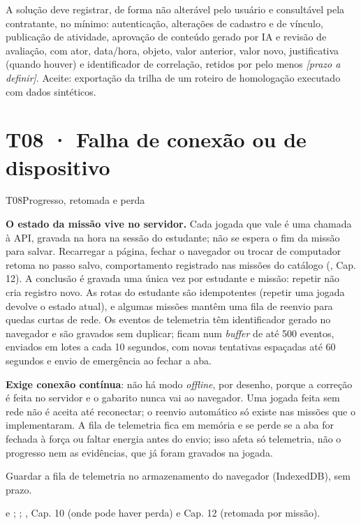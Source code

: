 \begin{paraotr}
A solução deve registrar, de forma não alterável pelo usuário e consultável
pela contratante, no mínimo: autenticação, alterações de cadastro e de
vínculo, publicação de atividade, aprovação de conteúdo gerado por IA e
revisão de avaliação, com ator, data/hora, objeto, valor anterior, valor novo,
justificativa (quando houver) e identificador de correlação, retidos por pelo
menos \textit{[prazo a definir]}. Aceite: exportação da trilha de um roteiro
de homologação executado com dados sintéticos.
\end{paraotr}

\section{T08 · Falha de conexão ou de dispositivo}
\label{sec:t08}

\begin{resposta}{T08}{Progresso, retomada e perda}{\parcial}
\begin{campos}
  \item[Hoje] \textbf{O estado da missão vive no servidor.} Cada jogada que
    vale é uma chamada à API, gravada na hora na sessão do estudante; não se
    espera o fim da missão para salvar. Recarregar a página, fechar o
    navegador ou trocar de computador retoma no passo salvo, comportamento
    registrado nas missões do catálogo (, Cap. 12). A conclusão
    é gravada uma única vez por estudante e missão: repetir não cria registro
    novo. As rotas do estudante são idempotentes (repetir uma jogada devolve o
    estado atual), e algumas missões mantêm uma fila de reenvio para quedas
    curtas de rede. Os eventos de telemetria têm identificador gerado no
    navegador e são gravados sem duplicar; ficam num \emph{buffer} de até 500
    eventos, enviados em lotes a cada 10 segundos, com novas tentativas
    espaçadas até 60 segundos e envio de emergência ao fechar a aba.
  \item[Limitações] \textbf{Exige conexão contínua}: não há modo
    \emph{offline}, por desenho, porque a correção é feita no servidor e o
    gabarito nunca vai ao navegador. Uma jogada feita sem rede não é aceita
    até reconectar; o reenvio automático só existe nas missões que o
    implementaram. A fila de telemetria fica em memória e se perde se a aba
    for fechada à força ou faltar energia antes do envio; isso afeta só
    telemetria, não o progresso nem as evidências, que já foram gravados na
    jogada.
  \item[Planejado] Guardar a fila de telemetria no armazenamento do navegador
    (IndexedDB), sem prazo.
  \item[Evidência]  e
    ; ;
    , Cap. 10 (onde pode haver perda) e Cap. 12 (retomada por
    missão).
\end{campos}
\end{resposta}

